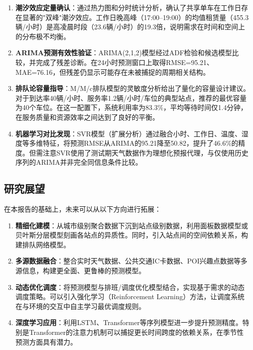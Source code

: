 \documentclass[12pt,a4paper]{article}
\begin{document}
\begin{enumerate}
  \item \textbf{潮汐效应定量确认}：通过热力图和分时统计分析，确认了共享单车在工作日存在显著的"双峰"潮汐效应。工作日晚高峰（17:00--19:00）的均值租赁量（455.3辆/小时）是高凌晨时段（23.6辆/小时）的19.3倍，说明需求在时间和空间上的分布极不均衡。
  
  \item \textbf{ARIMA预测有效性验证}：ARIMA(2,1,2)模型经过ADF检验和候选模型比较，并完成了残差诊断。在24小时预测窗口上取得RMSE=95.21、MAE=76.16，但残差仍显示可能存在未被捕捉的周期相关结构。
  
  \item \textbf{排队论容量指导}：M/M/c排队模型的灵敏度分析给出了量化的容量设计建议。对于到达率40辆/小时、服务率1.2辆/小时/车位的典型站点，推荐的最优容量为40个车位。在这一配置下，系统利用率为83.3\%，平均等待时间仅1.4分钟，在服务质量和资源效率之间达到了良好的平衡。
  
  \item \textbf{机器学习对比发现}：SVR模型（扩展分析）通过融合小时、工作日、温度、湿度等多维特征，将预测RMSE从ARIMA的95.21降至50.82，提升了46.6\%的精度。但需注意SVR使用了测试期天气数据作为理想化预报代理，与仅使用历史序列的ARIMA并非完全同信息条件比较。
\end{enumerate}

\subsection{研究展望}

在本报告的基础上，未来可以从以下方向进行拓展：

\begin{enumerate}
  \item \textbf{精细化建模}：从城市级别聚合数据下沉到站点级别数据，利用面板数据模型或贝叶斯分层模型刻画各站点的异质性。同时，引入站点间的空间依赖关系，构建排队网络模型。
  \item \textbf{多源数据融合}：整合实时天气数据、公共交通IC卡数据、POI兴趣点数据等多源信息，构建更全面、更鲁棒的预测模型。
  \item \textbf{动态优化调度}：将预测模型与排班/调度优化模型结合，实现基于需求的动态调度策略。可以引入强化学习（Reinforcement Learning）方法，让调度系统在与环境的交互中自主学习最优调度规则。
  \item \textbf{深度学习应用}：利用LSTM、Transformer等序列模型进一步提升预测精度。特别是Transformer的注意力机制可以捕捉更长时间跨度的依赖关系，在季节性预测方面具有潜力。
\end{enumerate}
\end{document}
